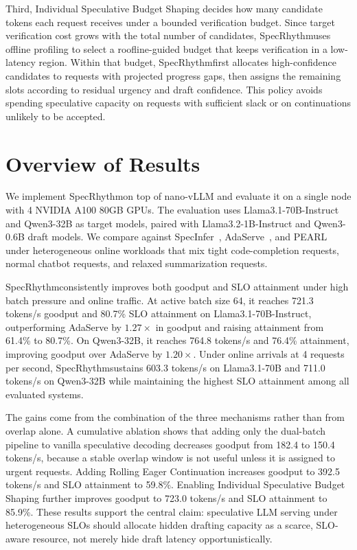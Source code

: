 \documentclass[sigplan,10pt,review,nonacm,anonymous]{acmart}
\newcommand{\system}{SpecRhythm}
\begin{document}
Third, Individual Speculative Budget Shaping decides how many candidate tokens each request receives under a bounded verification budget. Since target verification cost grows with the total number of candidates, \system uses offline profiling to select a roofline-guided budget that keeps verification in a low-latency region. Within that budget, \system first allocates high-confidence candidates to requests with projected progress gaps, then assigns the remaining slots according to residual urgency and draft confidence. This policy avoids spending speculative capacity on requests with sufficient slack or on continuations unlikely to be accepted.

\section*{Overview of Results}

We implement \system on top of nano-vLLM and evaluate it on a single node with 4 NVIDIA A100 80GB GPUs. The evaluation uses Llama3.1-70B-Instruct and Qwen3-32B as target models, paired with Llama3.2-1B-Instruct and Qwen3-0.6B draft models. We compare against SpecInfer~\cite{specinfer}, AdaServe~\cite{adaserve}, and PEARL~\cite{pearl} under heterogeneous online workloads that mix tight code-completion requests, normal chatbot requests, and relaxed summarization requests.

\system consistently improves both goodput and SLO attainment under high batch pressure and online traffic. At active batch size 64, it reaches 721.3 tokens/s goodput and 80.7\% SLO attainment on Llama3.1-70B-Instruct, outperforming AdaServe by $1.27\times$ in goodput and raising attainment from 61.4\% to 80.7\%. On Qwen3-32B, it reaches 764.8 tokens/s and 76.4\% attainment, improving goodput over AdaServe by $1.20\times$. Under online arrivals at 4 requests per second, \system sustains 603.3 tokens/s on Llama3.1-70B and 711.0 tokens/s on Qwen3-32B while maintaining the highest SLO attainment among all evaluated systems.

The gains come from the combination of the three mechanisms rather than from overlap alone. A cumulative ablation shows that adding only the dual-batch pipeline to vanilla speculative decoding decreases goodput from 182.4 to 150.4 tokens/s, because a stable overlap window is not useful unless it is assigned to urgent requests. Adding Rolling Eager Continuation increases goodput to 392.5 tokens/s and SLO attainment to 59.8\%. Enabling Individual Speculative Budget Shaping further improves goodput to 723.0 tokens/s and SLO attainment to 85.9\%. These results support the central claim: speculative LLM serving under heterogeneous SLOs should allocate hidden drafting capacity as a scarce, SLO-aware resource, not merely hide draft latency opportunistically.
\end{document}
